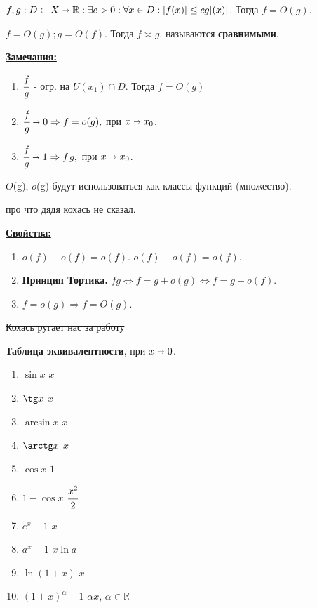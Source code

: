 \documentclass{article}
\newcommand{\deff}[1]{\underline{\textbf{#1}}}
\newcommand{\mytilde}{\raisebox{0.5ex}{\texttildelow}}
\begin{document}
$f,g: D \subset X \shortrightarrow \mathbb{R}: \exists c>0: \forall x \in D : |f(x)|\leq c g|(x)|$. Тогда $f = O(g)$.

$f = O(g); g = O(f).$ Тогда $f \asymp g$, называются \textbf{сравнимыми}.


\deff{Замечания:}

\begin{enumerate}
    \item $\cfrac{f}{g}$ - огр. на  $U(x_1) \cap D$. Тогда $f = O(g)$
    \item $\cfrac{f}{g}  \shortrightarrow 0 \Rightarrow f= o(g),$ при $x\shortrightarrow x_0$.
    \item $\cfrac{f}{g}  \shortrightarrow 1 \Rightarrow f$\mytilde$g,$ при $x\shortrightarrow x_0$.
\end{enumerate}

$O$(g), $o$(g)  будут использоваться как классы функций (множество).

\sout{про что дядя кохась не сказал.}

\deff{Свойства:}
\begin{enumerate}
    \item $o(f) + o(f) = o(f)$. $o(f) - o(f) = o(f)$.
    \item \textbf{Принцип Тортика.} $f$\mytilde$g \Leftrightarrow f = g + o(g)$$\Leftrightarrow f = g + o(f)$.
    \item $f = o(g) \Rightarrow f = O(g)$.
\end{enumerate}

\sout{Кохась ругает нас за работу}

\textbf{Таблица эквивалентности}, при $x\shortrightarrow 0$.

\begin{enumerate}
    \item $\sin x $ \mytilde $ x$
    \item $\tg x $ \mytilde $ x$
    \item $\arcsin x $ \mytilde $ x$
    \item $\arctg x $ \mytilde $ x$
    \item $\cos x $ \mytilde $ 1$
    \item $1 - \cos x $ \mytilde $ \cfrac{x^2}{2}$
    \item $e^x-1 $ \mytilde $ x$
    \item $a^x-1 $ \mytilde $ x \ln a$
    \item $\ln (1+x)$ \mytilde $x$
    \item $(1+x)^\alpha -1$ \mytilde $\alpha x$, $\alpha \in \mathbb{R}$
    
\end{enumerate}
\end{document}
